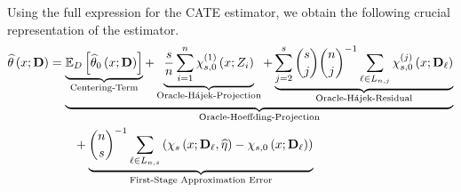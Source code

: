 Using the full expression for the CATE estimator, we obtain the following crucial representation of the estimator.
\begin{equation}\label{eq:DNNDML2_Decomp}
    \begin{aligned}
        \widehat{\theta}\left(x; \mathbf{D}\right)
        & = \underbrace{\underbrace{\mathbb{E}_{D}\left[\widehat{\theta}_{0}\left(x; \mathbf{D}\right)\right]}_{\text{Centering-Term}}
        + \underbrace{\frac{s}{n}\sum_{i = 1}^{n} \chi_{s,0}^{(1)}\left(x; Z_{i}\right)}_{\text{Oracle-H\'ajek-Projection}}
        + \underbrace{\sum_{j = 2}^{s} \binom{s}{j} \binom{n}{j}^{-1}\sum_{\ell \in L_{n,j}} \chi_{s,0}^{(j)}\left(x; \mathbf{D}_{\ell}\right)}_{\text{Oracle-H\'ajek-Residual}}}_{\text{Oracle-Hoeffding-Projection}}\\
        & \quad \quad + \underbrace{\binom{n}{s}^{-1}\sum_{\ell \in L_{n,s}}\left(\chi_{s}\left(x; \mathbf{D}_{\ell}, \widehat{\eta}\right) - \chi_{s,0}\left(x; \mathbf{D}_{\ell}\right)\right)}_{\text{First-Stage Approximation Error}}
    \end{aligned}
\end{equation}

